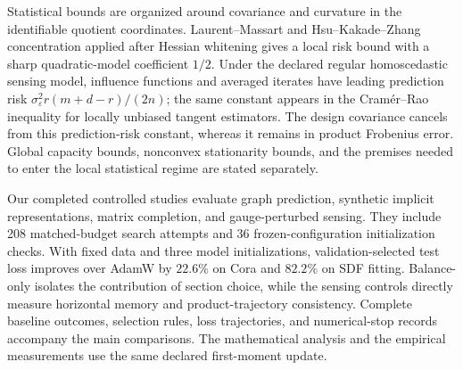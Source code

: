 Statistical bounds are organized around covariance and curvature in
the identifiable quotient coordinates. Laurent--Massart and
Hsu--Kakade--Zhang concentration applied after Hessian whitening gives
a local risk bound with a sharp quadratic-model coefficient $1/2$.
Under the declared regular homoscedastic sensing model, influence
functions and averaged iterates have leading prediction risk
$\sigma_\varepsilon^2r(m+d-r)/(2n)$; the same constant appears in
the Cram\'er--Rao inequality for locally unbiased tangent estimators.
The design covariance cancels from this prediction-risk constant,
whereas it remains in product Frobenius error.
Global capacity bounds, nonconvex stationarity bounds, and the premises
needed to enter the local statistical regime are stated separately.

Our completed controlled studies evaluate graph prediction, synthetic
implicit representations, matrix completion, and gauge-perturbed sensing.
They include 208 matched-budget search attempts and 36 frozen-configuration
initialization checks. With fixed data and three model initializations,
validation-selected test loss improves over AdamW by $22.6\%$ on Cora
and $82.2\%$ on SDF fitting. Balance-only isolates the contribution of
section choice, while the sensing controls directly measure horizontal
memory and product-trajectory consistency. Complete baseline outcomes,
selection rules, loss trajectories, and numerical-stop records accompany
the main comparisons. The mathematical analysis and the empirical
measurements use the same declared first-moment update.
